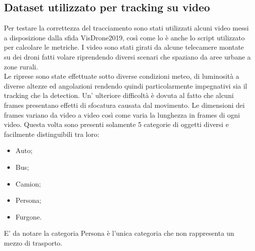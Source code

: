 \subsection{Dataset utilizzato per tracking su video}
Per testare la correttezza del tracciamento sono stati utilizzati alcuni video messi a disposizione dalla sfida VisDrone2019, così come lo è anche lo script utilizzato per calcolare le metriche. I video sono stati girati da alcune telecamere montate su dei droni fatti volare riprendendo diversi scenari che spaziano da aree urbane a zone rurali.\\
Le riprese sono state effettuate sotto diverse condizioni meteo, di luminosità a diverse altezze ed angolazioni rendendo quindi particolarmente impegnativi sia il tracking che la detection. Un' ulteriore difficoltà è dovuta al fatto che alcuni frames presentano effetti di sfocatura causata dal movimento. Le dimensioni dei frames variano da video a video così come varia la lunghezza in frames di ogni video. Questa volta sono presenti solamente 5 categorie di oggetti diversi e facilmente distinguibili tra loro:
\begin{itemize}
\item Auto;
\item Bus;
\item Camion;
\item Persona;
\item Furgone.
\end{itemize}
E' da notare la categoria Persona è l'unica categoria che non rappresenta un mezzo di trasporto.

